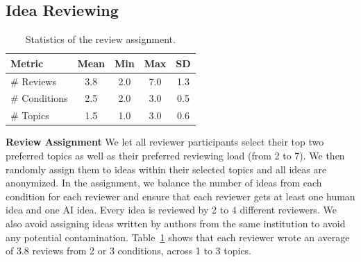 



\subsection{Idea Reviewing}

\begin{table}
\centering
\small  
\begin{tabular}{l c c c c} 
 \hline
 Metric & Mean & Min & Max & SD \\ 
 \hline
\# Reviews & 3.8 & 2.0 & 7.0 & 1.3 \\
\# Conditions & 2.5 & 2.0 & 3.0 & 0.5 \\
\# Topics & 1.5 & 1.0 & 3.0 & 0.6 \\
 \hline
\end{tabular}
\caption{Statistics of the review assignment.}
\label{table:reviewer_assignment}
\end{table}


\textbf{Review Assignment}
We let all reviewer participants select their top two preferred topics as well as their preferred reviewing load (from 2 to 7). 
We then randomly assign them to ideas within their selected topics and all ideas are anonymized. 
In the assignment, we balance the number of ideas from each condition for each reviewer and ensure that each reviewer gets at least one human idea and one AI idea. 
Every idea is reviewed by 2 to 4 different reviewers. 
We also avoid assigning ideas written by authors from the same institution to avoid any potential contamination. 
Table~\ref{table:reviewer_assignment} shows that each reviewer wrote an average of 3.8 reviews from 2 or 3 conditions, across 1 to 3 topics. 




